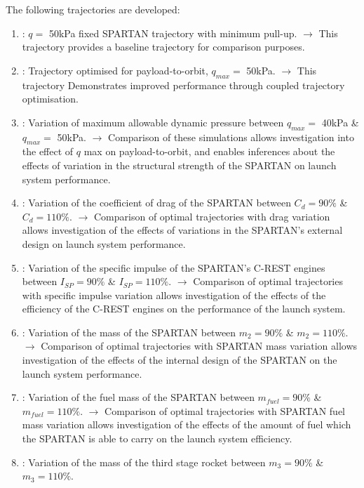 The following trajectories are developed: 
\begin{enumerate}
	\item: $q = $ 50kPa fixed SPARTAN trajectory with minimum pull-up. \newline$\rightarrow$ This trajectory provides a baseline trajectory for comparison purposes.
	\item: Trajectory optimised for payload-to-orbit, $q_{max} = $ 50kPa. \newline$\rightarrow$ This trajectory Demonstrates improved performance through coupled trajectory optimisation.
	\item: Variation of maximum allowable dynamic pressure between $q_{max} = $ 40kPa \& $q_{max} = $ 50kPa. 
	\newline$\rightarrow$ Comparison of these simulations allows investigation into the effect of $q$ max on payload-to-orbit, and enables inferences about the effects of variation in the structural strength of the SPARTAN on launch system performance.
	\item: Variation of the coefficient of drag of the SPARTAN between $C_d = 90\%$ \& $C_d = 110\%$. 
	\newline$\rightarrow$ Comparison of optimal trajectories with drag variation allows investigation of the effects of variations in the SPARTAN's external design on launch system performance.
	\item: Variation of the specific impulse of the SPARTAN's C-REST engines between $I_{SP} = 90\%$ \& $I_{SP} = 110\%$. 
	\newline$\rightarrow$ Comparison of optimal trajectories with specific impulse variation allows investigation of the effects of the efficiency of the C-REST engines on the performance of the launch system. 
	\item: Variation of the mass of the SPARTAN between $m_2 = 90\%$ \& $m_2 = 110\%$. 
	\newline$\rightarrow$ Comparison of optimal trajectories with SPARTAN mass variation allows investigation of the effects of the internal design of the SPARTAN on the launch system performance. 
	\item: Variation of the fuel mass of the SPARTAN between $m_{fuel} = 90\%$ \& $m_{fuel} = 110\%$. 
	\newline$\rightarrow$ Comparison of optimal trajectories with SPARTAN fuel mass variation allows investigation of the effects of the amount of fuel which the SPARTAN is able to carry on the launch system efficiency. 
	\item: Variation of the mass of the third stage rocket between $m_3 = 90\%$ \& $m_3 = 110\%$. 

\end{enumerate}
